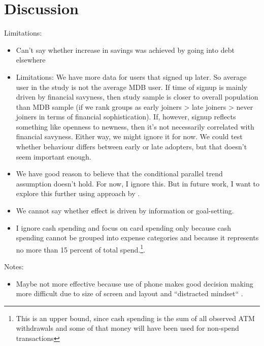 
\section{Discussion}%
\label{sec:discussion}

Limitations:
\begin{itemize}
    \item Can't say whether increase in savings was achieved by going into
        debt elsewhere

    \item Limitations: We have more data for users that signed up later. So average user in
        the study is not the average MDB user. If time of signup is mainly
        driven by financial savyness, then study sample is closer to overall
        population than MDB sample (if we rank groups as early joiners > late
        joiners > never joiners in terms of financial sophistication). If,
        however, signup reflects something like openness to newness, then it's
        not necessarily correlated with financial savyness. Either way, we
        might ignore it for now. We could test whether behaviour differs
        between early or late adopters, but that doesn't seem important enough.

    \item We have good reason to believe that the conditional parallel trend
        assumption doesn't hold. For now, I ignore this. But in future work, I
        want to explore this further using approach by
        \citet{rambachan2022more}.

    \item We cannot say whether effect is driven by information or
        goal-setting.

    \item I ignore cash spending and focus on card spending only because cash
        spending cannot be grouped into expense categories and because it
        represents no more than 15 percent of total spend.\footnote{This is an
            upper bound, since cash spending is the sum of all observed ATM
        withdrawals and some of that money will have been used for non-spend
    transactions}.

\end{itemize}


Notes:
\begin{itemize}
    \item Maybe not more effective because use of phone makes good decision
        making more difficult due to size of screen and layout and ``distracted
        mindset`` \citet{levi2020mind}.
\end{itemize}
